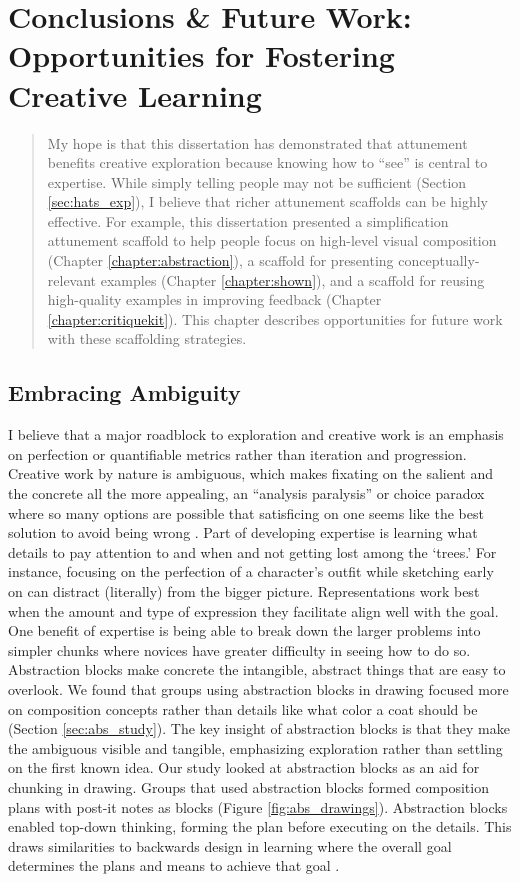 \chapter{Conclusions \& Future Work: Opportunities for Fostering Creative Learning}
\begin{quote}
    My hope is that this dissertation has demonstrated that attunement benefits creative exploration because knowing how to ``see'' is central to expertise. While simply telling people may not be sufficient (Section \ref{sec:hats_exp}), I believe that richer attunement scaffolds can be highly effective. For example, this dissertation presented a simplification attunement scaffold to help people focus on high-level visual composition (Chapter \ref{chapter:abstraction}), a scaffold for presenting conceptually-relevant examples (Chapter \ref{chapter:shown}), and a scaffold for reusing high-quality examples in improving feedback (Chapter \ref{chapter:critiquekit}). This chapter describes opportunities for future work with these scaffolding strategies.
\end{quote}

\section{Embracing Ambiguity}
I believe that a major roadblock to exploration and creative work is an emphasis on perfection or quantifiable metrics rather than iteration and progression. Creative work by nature is ambiguous, which makes fixating on the salient and the concrete all the more appealing, an ``analysis paralysis'' or choice paradox where so many options are possible that satisficing on one seems like the best solution to avoid being wrong \cite{grant2021think,schwartz2004paradox,simon1972theories}. Part of developing expertise is learning what details to pay attention to and when and not getting lost among the `trees.' For instance, focusing on the perfection of a character's outfit while sketching early on can distract (literally) from the bigger picture. Representations work best when the amount and type of expression they facilitate align well with the goal. One benefit of expertise is being able to break down the larger problems into simpler chunks where novices have greater difficulty in seeing how to do so. Abstraction blocks make concrete the intangible, abstract things that are easy to overlook. We found that groups using abstraction blocks in drawing focused more on composition concepts rather than details like what color a coat should be (Section \ref{sec:abs_study}). The key insight of abstraction blocks is that they make the ambiguous visible and tangible, emphasizing exploration rather than settling on the first known idea. Our study looked at abstraction blocks as an aid for chunking in drawing. Groups that used abstraction blocks formed composition plans with post-it notes as blocks (Figure \ref{fig:abs_drawings}). Abstraction blocks enabled top-down thinking, forming the plan before executing on the details. This draws similarities to backwards design in learning where the overall goal determines the plans and means to achieve that goal \cite{wiggins2005understanding}. 

